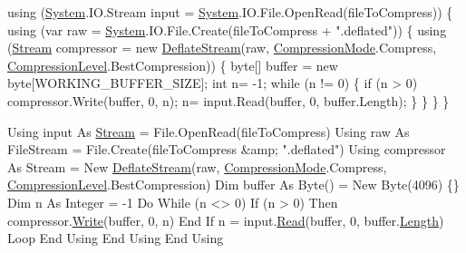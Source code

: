 \begin{DoxyCode}
\textcolor{keyword}{using} (\mbox{\hyperlink{namespace_system}{System}}.IO.Stream input = \mbox{\hyperlink{namespace_system}{System}}.IO.File.OpenRead(fileToCompress))
\{
    \textcolor{keyword}{using} (var raw = \mbox{\hyperlink{namespace_system}{System}}.IO.File.Create(fileToCompress + \textcolor{stringliteral}{".deflated"}))
    \{
        \textcolor{keyword}{using} (\mbox{\hyperlink{namespace_super_tiled2_unity_1_1_ionic_1_1_zip_a9ced5352c56e7e0fceff15b534073c83aeae835e83c0494a376229f254f7d3392}{Stream}} compressor = \textcolor{keyword}{new} \mbox{\hyperlink{class_super_tiled2_unity_1_1_ionic_1_1_zlib_1_1_deflate_stream_af95bf312acc17bc60b20767178959549}{DeflateStream}}(raw,
                                                     \mbox{\hyperlink{namespace_super_tiled2_unity_1_1_ionic_1_1_zlib_ad5b7635d92497e1c905e5de82eb1c6b1}{CompressionMode}}.Compress,
                                                     \mbox{\hyperlink{namespace_super_tiled2_unity_1_1_ionic_1_1_zlib_a20f6771804996c363f454ad9765cd7db}{CompressionLevel}}.BestCompression))
        \{
            byte[] buffer = \textcolor{keyword}{new} byte[WORKING\_BUFFER\_SIZE];
            \textcolor{keywordtype}{int} n= -1;
            \textcolor{keywordflow}{while} (n != 0)
            \{
                \textcolor{keywordflow}{if} (n > 0)
                    compressor.Write(buffer, 0, n);
                n= input.Read(buffer, 0, buffer.Length);
            \}
        \}
    \}
\}
\end{DoxyCode}



\begin{DoxyCode}
Using input As \mbox{\hyperlink{namespace_super_tiled2_unity_1_1_ionic_1_1_zip_a9ced5352c56e7e0fceff15b534073c83aeae835e83c0494a376229f254f7d3392}{Stream}} = File.OpenRead(fileToCompress)
    Using raw As FileStream = File.Create(fileToCompress &amp; \textcolor{stringliteral}{".deflated"})
        Using compressor As Stream = New \mbox{\hyperlink{class_super_tiled2_unity_1_1_ionic_1_1_zlib_1_1_deflate_stream_af95bf312acc17bc60b20767178959549}{DeflateStream}}(raw, 
      \mbox{\hyperlink{namespace_super_tiled2_unity_1_1_ionic_1_1_zlib_ad5b7635d92497e1c905e5de82eb1c6b1}{CompressionMode}}.Compress, \mbox{\hyperlink{namespace_super_tiled2_unity_1_1_ionic_1_1_zlib_a20f6771804996c363f454ad9765cd7db}{CompressionLevel}}.BestCompression)
            Dim buffer As Byte() = New Byte(4096) \{\}
            Dim n As Integer = -1
            Do While (n <> 0)
                If (n > 0) Then
                    compressor.\mbox{\hyperlink{class_super_tiled2_unity_1_1_ionic_1_1_zlib_1_1_deflate_stream_a751d2c556423679f9267bc2a45ce3539}{Write}}(buffer, 0, n)
                End If
                n = input.\mbox{\hyperlink{class_super_tiled2_unity_1_1_ionic_1_1_zlib_1_1_deflate_stream_a7adaf1072e4bc9be5914923eb2bc0636}{Read}}(buffer, 0, buffer.\mbox{\hyperlink{class_super_tiled2_unity_1_1_ionic_1_1_zlib_1_1_deflate_stream_a552b6fd67670fa655ad82c4ca192bc7a}{Length}})
            Loop
        End Using
    End Using
End Using
\end{DoxyCode}
 



